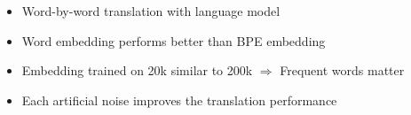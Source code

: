 \documentclass[11pt, a4paper, landscape]{article}
\begin{document}
	\begin{itemize}
		\item Word-by-word translation with language model
		\item Word embedding performs better than BPE embedding
		\item Embedding trained on 20k similar to 200k $\Rightarrow$ Frequent words matter
	\end{itemize}	
		\vfill





	\NewPage
		\vfill

		\begin{table}[!h]
			\centering
			\setcounter{table}{1}
			\label{tab:denoising}
		\end{table}

	\begin{itemize}
		\item Each artificial noise improves the translation performance
	\end{itemize}
		\vfill	
		
	
\end{document}
